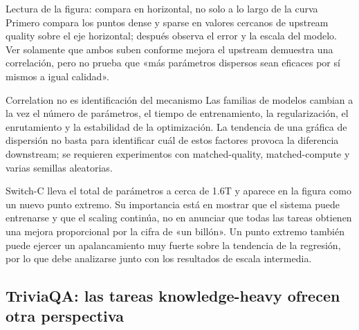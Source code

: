 \begin{knowledgebox}{Lectura de la figura: compara en horizontal, no solo a lo largo de la curva}
Primero compara los puntos dense y sparse en valores cercanos de upstream quality sobre el eje horizontal; después observa el error y la escala del modelo. Ver solamente que ambos suben conforme mejora el upstream demuestra una correlación, pero no prueba que «más parámetros dispersos sean eficaces por sí mismos a igual calidad».
\end{knowledgebox}

\begin{warningbox}{Correlation no es identificación del mecanismo}
Las familias de modelos cambian a la vez el número de parámetros, el tiempo de entrenamiento, la regularización, el enrutamiento y la estabilidad de la optimización. La tendencia de una gráfica de dispersión no basta para identificar cuál de estos factores provoca la diferencia downstream; se requieren experimentos con matched-quality, matched-compute y varias semillas aleatorias.
\end{warningbox}

Switch-C lleva el total de parámetros a cerca de 1.6T y aparece en la figura como un nuevo punto extremo. Su importancia está en mostrar que el sistema puede entrenarse y que el scaling continúa, no en anunciar que todas las tareas obtienen una mejora proporcional por la cifra de «un billón». Un punto extremo también puede ejercer un apalancamiento muy fuerte sobre la tendencia de la regresión, por lo que debe analizarse junto con los resultados de escala intermedia.



\subsection{TriviaQA: las tareas knowledge-heavy ofrecen otra perspectiva}

